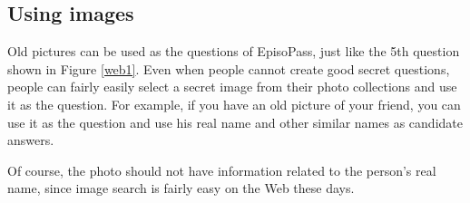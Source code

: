 \documentclass{sigchi}
\begin{document}
\subsection{Using images}

Old pictures can be used as the questions of EpisoPass,
just like the 5th question shown in Figure \ref{web1}.
Even when people cannot create good secret questions,
people can fairly easily select a secret image from their photo collections
and use it as the question.
For example, if you have an old picture of your friend,
you can use it as the question
and use his real name and other similar names as candidate answers.


Of course, the photo should not have information related to the
person's real name, since image search is fairly easy on the Web these days.



% 
% 
% 
%
\end{document}
